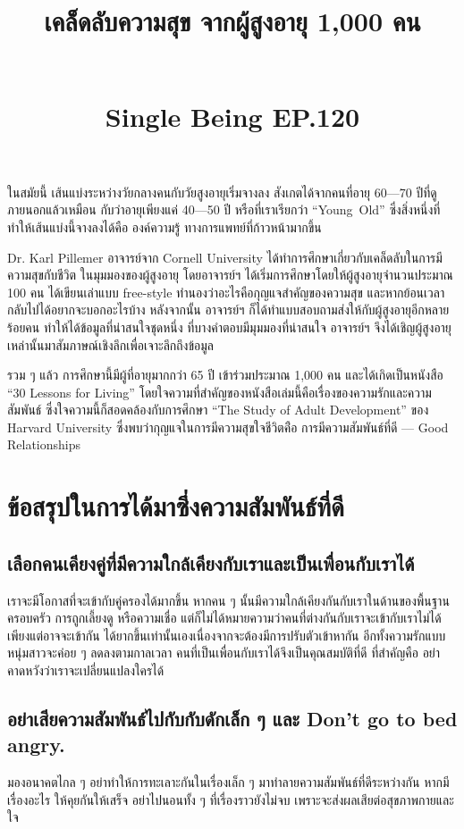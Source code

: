 \documentclass{article}
\title{\flushleft\Huge\textbf{เคล็ดลับความสุข จากผู้สูงอายุ 1,000 คน}\\
\normalsize\rule{0em}{1ex}\\
\Large Single Being EP.120}
\author{}
\date{}
\begin{document}
\maketitle
\sloppy

ในสมัยนี้ เส้นแบ่งระหว่างวัยกลางคนกับวัยสูงอายุเริ่มจางลง สังเกตได้จากคนที่อายุ 60---70 ปีที่ดูภายนอกแล้วเหมือน
กับว่าอายุเพียงแค่ 40---50 ปี หรือที่เราเรียกว่า \mbox{``Young Old''} ซึ่งสิ่งหนึ่งที่ทำให้เส้นแบ่งนี้จางลงได้คือ องค์ความรู้
ทางการแพทย์ที่ก้าวหน้ามากขึ้น

\rule{0em}{1ex}

Dr. Karl Pillemer อาจารย์จาก Cornell University ได้ทำการศึกษาเกี่ยวกับเคล็ดลับในการมีความสุขกับชีวิต
ในมุมมองของผู้สูงอายุ โดยอาจารย์ฯ ได้เริ่มการศึกษาโดยให้ผู้สูงอายุจำนวนประมาณ 100 คน ได้เขียนเล่าแบบ
free-style ทำนองว่าอะไรคือกุญแจสำคัญของความสุข และหากย้อนเวลากลับไปได้อยากจะบอกอะไรบ้าง
หลังจากนั้น อาจารย์ฯ ก็ได้ทำแบบสอบถามส่งให้กับผู้สูงอายุอีกหลายร้อยคน ทำให้ได้ข้อมูลที่น่าสนใจชุดหนึ่ง
ที่บางคำตอบมีมุมมองที่น่าสนใจ อาจารย์ฯ จึงได้เชิญผู้สูงอายุเหล่านั้นมาสัมภาษณ์เชิงลึกเพื่อเจาะลึกถึงข้อมูล

\rule{0em}{1ex}

รวม ๆ แล้ว การศึกษานี้มีผู้ที่อายุมากกว่า 65 ปี เข้าร่วมประมาณ 1,000 คน และได้เกิดเป็นหนังสือ
``30 Lessons for Living'' โดยใจความที่สำคัญของหนังสือเล่มนี้คือเรื่องของความรักและความสัมพันธ์
ซึ่งใจความนี้ก็สอดคล้องกับการศึกษา ``The Study of Adult Development'' ของ Harvard University
ซึ่งพบว่ากุญแจในการมีความสุขใจชีวิตค่ือ การมีความสัมพันธ์ที่ดี --- Good Relationships

\rule{0em}{1ex}

\section*{ข้อสรุปในการได้มาซึ่งความสัมพันธ์ที่ดี}


\subsection*{เลือกคนเคียงคู่ที่มีความใกล้เคียงกับเราและเป็นเพื่อนกับเราได้}
เราจะมีโอกาสที่จะเข้ากับคู่ครองได้มากขึ้น หากคน ๆ นั้นมีความใกล้เคียงกันกับเราในด้านของพื้นฐานครอบครัว
การถูกเลี้ยงดู หรือความเชื่อ แต่ก็ไม่ได้หมายความว่าคนที่ต่างกันกับเราจะเข้ากับเราไม่ได้ เพียงแต่อาจจะเข้ากัน
ได้ยากขึ้นเท่านั้นเองเนื่องจากจะต้องมีการปรับตัวเข้าหากัน อีกทั้งความรักแบบหนุ่มสาวจะค่อย ๆ ลดลงตามกาลเวลา 
คนที่เป็นเพื่อนกับเราได้จึงเป็นคุณสมบัติที่ดี ที่สำคัญคือ อย่าคาดหวังว่าเราจะเปลี่ยนแปลงใครได้

\subsection*{อย่าเสียความสัมพันธ์ไปกับกับดักเล็ก ๆ และ Don't go to bed angry.}
มองอนาคตไกล ๆ อย่าทำให้การทะเลาะกันในเรื่องเล็ก ๆ มาทำลายความสัมพันธ์ที่ดีระหว่างกัน
หากมีเรื่องอะไร ให้คุยกันให้เสร็จ อย่าไปนอนทั้ง ๆ ที่เรื่องราวยังไม่จบ เพราะจะส่งผลเสียต่อสุขภาพกายและใจ
\end{document}
